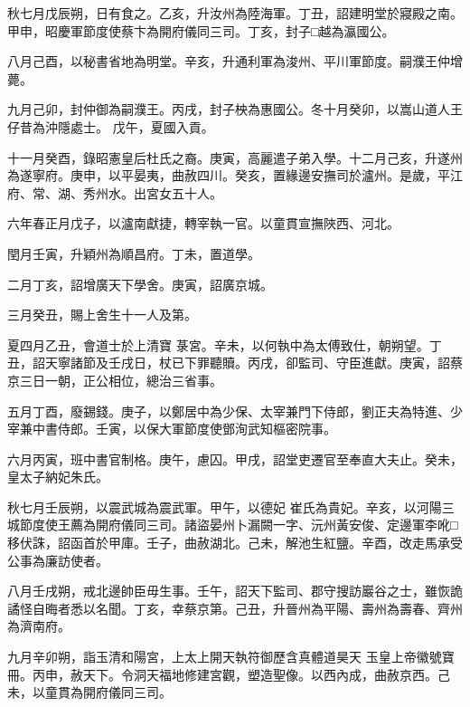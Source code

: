 \begin{pinyinscope}
 秋七月戊辰朔，日有食之。乙亥，升汝州為陸海軍。丁丑，詔建明堂於寢殿之南。甲申，昭慶軍節度使蔡卞為開府儀同三司。丁亥，封子□越為瀛國公。



 八月己酉，以秘書省地為明堂。辛亥，升通利軍為浚州、平川軍節度。嗣濮王仲增薨。



 九月己卯，封仲御為嗣濮王。丙戌，封子柍為惠國公。冬十月癸卯，以嵩山道人王仔昔為沖隱處士。
 戊午，夏國入貢。



 十一月癸酉，錄昭憲皇后杜氏之裔。庚寅，高麗遣子弟入學。十二月己亥，升遂州為遂寧府。庚申，以平晏夷，曲赦四川。癸亥，置緣邊安撫司於瀘州。是歲，平江府、常、湖、秀州水。出宮女五十人。



 六年春正月戊子，以瀘南獻捷，轉宰執一官。以童貫宣撫陜西、河北。



 閏月壬寅，升穎州為順昌府。丁未，置道學。



 二月丁亥，詔增廣天下學舍。庚寅，詔廣京城。



 三月癸丑，賜上舍生十一人及第。



 夏四月乙丑，會道士於上清寶
 菉宮。辛未，以何執中為太傅致仕，朝朔望。丁丑，詔天寧諸節及壬戌日，杖已下罪聽贖。丙戌，卻監司、守臣進獻。庚寅，詔蔡京三日一朝，正公相位，總治三省事。



 五月丁酉，廢錫錢。庚子，以鄭居中為少保、太宰兼門下侍郎，劉正夫為特進、少宰兼中書侍郎。壬寅，以保大軍節度使鄧洵武知樞密院事。



 六月丙寅，班中書官制格。庚午，慮囚。甲戌，詔堂吏遷官至奉直大夫止。癸未，皇太子納妃朱氏。



 秋七月壬辰朔，以震武城為震武軍。甲午，以德妃
 崔氏為貴妃。辛亥，以河陽三城節度使王薦為開府儀同三司。諸盜晏州卜漏闕一字、沅州黃安俊、定邊軍李吪□移伏誅，詔函首於甲庫。壬子，曲赦湖北。己未，解池生紅鹽。辛酉，改走馬承受公事為廉訪使者。



 八月壬戌朔，戒北邊帥臣毋生事。壬午，詔天下監司、郡守搜訪巖谷之士，雖恢詭譎怪自晦者悉以名聞。丁亥，幸蔡京第。己丑，升晉州為平陽、壽州為壽春、齊州為濟南府。



 九月辛卯朔，詣玉清和陽宮，上太上開天執符御歷含真體道昊天
 玉皇上帝徽號寶冊。丙申，赦天下。令洞天福地修建宮觀，塑造聖像。以西內成，曲赦京西。己未，以童貫為開府儀同三司。




\end{pinyinscope}
